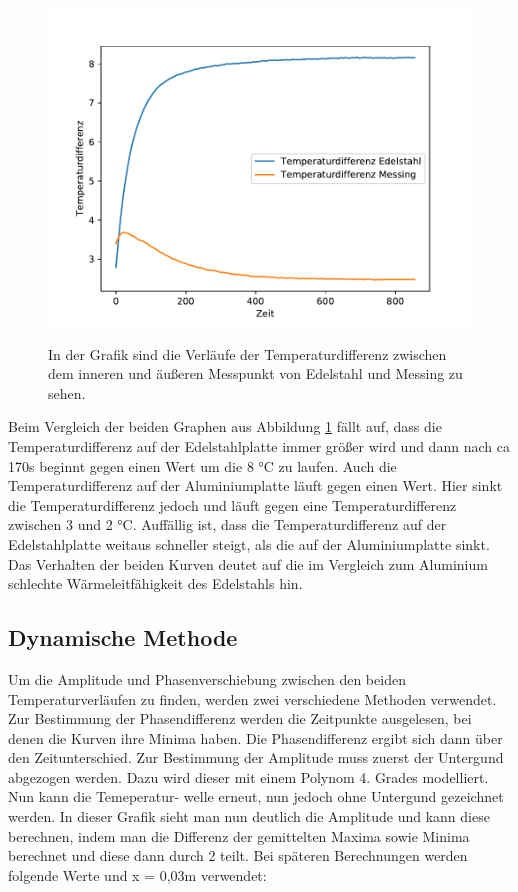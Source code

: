 \documentclass[titlepage = firstcover]{scrartcl}
\begin{document}
  \newpage

  \begin{figure}
    \centering
    \caption{In der Grafik sind die Verläufe der Temperaturdifferenz zwischen dem inneren und äußeren Messpunkt von Edelstahl
             und Messing zu sehen.}
    \includegraphics{diffstatisch.pdf}
    \label{fig:diffstat}
  \end{figure}

  

  Beim Vergleich der beiden Graphen aus Abbildung \ref{fig:diffstat} fällt auf, dass die Temperaturdifferenz auf der Edelstahlplatte immer größer wird und dann nach ca 170s beginnt gegen einen
  Wert um die 8 °C zu laufen. Auch die Temperaturdifferenz auf der Aluminiumplatte läuft gegen einen Wert. Hier sinkt die Temperaturdifferenz jedoch und läuft
  gegen eine Temperaturdifferenz zwischen 3  und 2 °C. Auffällig ist, dass die Temperaturdifferenz auf der Edelstahlplatte weitaus schneller steigt, als die 
  auf der Aluminiumplatte sinkt. Das Verhalten der beiden Kurven deutet auf die im Vergleich zum Aluminium schlechte Wärmeleitfähigkeit des Edelstahls hin.

  \FloatBarrier

  \newpage

  \subsection{Dynamische Methode}
  Um die Amplitude und Phasenverschiebung zwischen den beiden Temperaturverläufen zu finden, werden zwei verschiedene Methoden verwendet. Zur Bestimmung
  der Phasendifferenz werden die Zeitpunkte ausgelesen, bei denen die Kurven ihre Minima haben. Die Phasendifferenz ergibt sich dann über den Zeitunterschied.
  Zur Bestimmung der Amplitude muss zuerst der Untergund abgezogen werden. Dazu wird dieser mit einem Polynom 4. Grades modelliert. Nun kann die Temeperatur-
  welle erneut, nun jedoch ohne Untergund gezeichnet werden. In dieser Grafik sieht man nun deutlich die Amplitude und kann diese berechnen, indem man die 
  Differenz der gemittelten Maxima sowie Minima berechnet und diese dann durch 2 teilt. Bei späteren Berechnungen werden folgende Werte und x = 0,03m verwendet:
\end{document}
